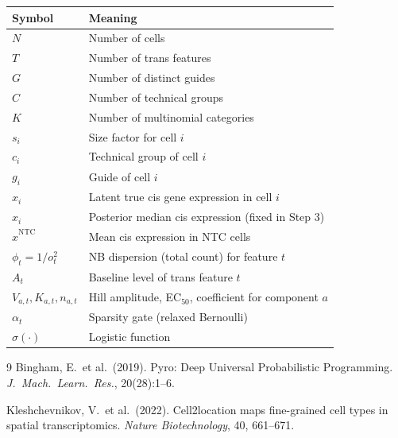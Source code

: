 \documentclass[12pt]{article}
\begin{document}
\begin{tabular}{ll}
\toprule
Symbol & Meaning \\
\midrule
$N$ & Number of cells \\
$T$ & Number of trans features \\
$G$ & Number of distinct guides \\
$C$ & Number of technical groups \\
$K$ & Number of multinomial categories \\
$s_i$ & Size factor for cell $i$ \\
$c_i$ & Technical group of cell $i$ \\
$g_i$ & Guide of cell $i$ \\
$x_i$ & Latent true cis gene expression in cell $i$ \\
$\hat x_i$ & Posterior median cis expression (fixed in Step 3) \\
$\hat x^{\mathrm{NTC}}$ & Mean cis expression in NTC cells \\
$\phi_t = 1/o_t^2$ & NB dispersion (total count) for feature $t$ \\
$A_t$ & Baseline level of trans feature $t$ \\
$V_{a,t}, K_{a,t}, n_{a,t}$ & Hill amplitude, EC$_{50}$, coefficient for component $a$ \\
$\alpha_t$ & Sparsity gate (relaxed Bernoulli) \\
$\sigma(\cdot)$ & Logistic function \\
\bottomrule
\end{tabular}


\begin{thebibliography}{9}
  Bingham, E.\ et al.\ (2019).
  Pyro: Deep Universal Probabilistic Programming.
  \textit{J.\ Mach.\ Learn.\ Res.}, 20(28):1--6.

  Kleshchevnikov, V.\ et al.\ (2022).
  Cell2location maps fine-grained cell types in spatial transcriptomics.
  \textit{Nature Biotechnology}, 40, 661--671.

\end{thebibliography}
\end{document}

